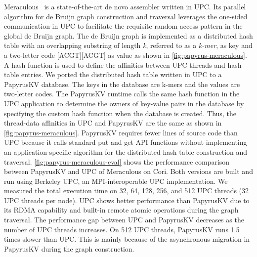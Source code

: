 Meraculous~\cite{Georganas:2014:PDB} is a state-of-the-art de novo assembler written in UPC. Its parallel algorithm for de Bruijn graph construction and traversal leverages the one-sided communication in UPC to facilitate the requisite random access pattern in the global de Bruijn graph. The de Bruijn graph is implemented as a distributed hash table with an overlapping substring of length {\it k}, referred to as a {\it k-mer}, as key and a two-letter code [ACGT][ACGT] as value as shown in \autoref{fig:papyrus-meraculous}. A hash function is used to define the affinities between UPC threads and hash table entries. We ported the distributed hash table written in UPC to a PapyrusKV database. The keys in the database are k-mers and the values are two-letter codes. The PapyrusKV runtime calls the same hash function in the UPC application to determine the owners of key-value pairs in the database by specifying the custom hash function when the database is created. Thus, the thread-data affinities in UPC and PapyrusKV are the same as shown in \autoref{fig:papyrus-meraculous}. PapyrusKV requires fewer lines of source code than UPC because it calls standard put and get API functions without implementing an application-specific algorithm for the distributed hash table construction and traversal. \autoref{fig:papyrus-meraculous-eval} shows the performance comparison between PapyrusKV and UPC of Meraculous on Cori. Both versions are built and run using Berkeley UPC, an MPI-interoperable UPC implementation. We measured the total execution time on 32, 64, 128, 256, and 512 UPC threads (32 UPC threads per node). UPC shows better performance than PapyrusKV due to its RDMA capability and built-in remote atomic operations during the graph traversal. The performance gap between UPC and PapyrusKV decreases as the number of UPC threads increases. On 512 UPC threads, PapyrusKV runs 1.5 times slower than UPC. This is mainly because of the asynchronous migration in PapyrusKV during the graph construction.

%


